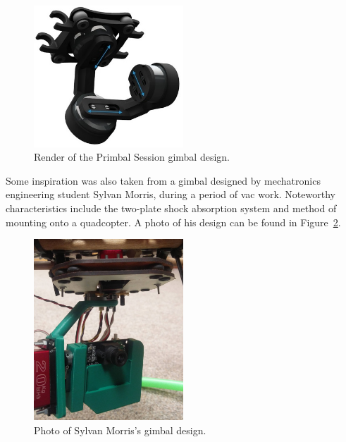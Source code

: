 \begin{figure}[h!]
  \centering
  \includegraphics[width=0.5\textwidth]{literature_review/primbal_pic.jpg}
  \caption{\label{fig:primbal_pic} Render of the Primbal Session gimbal design.}
\end{figure}

Some inspiration was also taken from a gimbal designed by mechatronics engineering student Sylvan Morris, during a period of vac work. Noteworthy characteristics include the two-plate shock absorption system and method of mounting onto a quadcopter. A photo of his design can be found in Figure~\ref{fig:sylvan_gimbal}.

\begin{figure}[h!]
  \centering
  \includegraphics[width=0.5\textwidth]{literature_review/sylvan_gimbal.jpg}
  \caption{\label{fig:sylvan_gimbal} Photo of Sylvan Morris's gimbal design.}
\end{figure}

